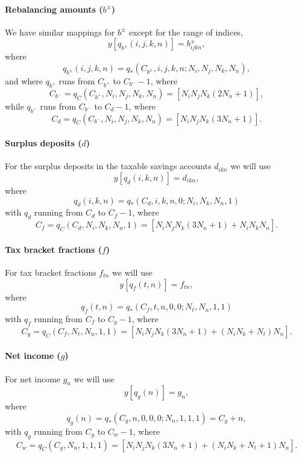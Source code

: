 \documentclass{article}[fleqn,12pt]
\begin{document}
\paragraph*{Rebalancing amounts (\boldmath$b^\pm$)}
We have similar mappings for $b^\pm$ except for the range of indices,
\begin{equation}
	y[q_{b^\pm}(i, j, k, n)] = b^\pm_{ijkn},
\end{equation}
where
\begin{equation}
	q_{b^\pm}(i, j, k, n) = q_*(C_{b^\pm}, i, j, k, n; N_i, N_j, N_k, N_n),
\end{equation}
and where
$q_{b^+}$ runs from $C_{b^+}$ to $C_{b^-} - 1$,
where
\[
	C_{b^-} = q_C(C_{b^+}, N_i, N_j, N_k, N_n) = [N_i N_j N_k (2N_n + 1)],
\]
while
$q_{b^-}$ runs from $C_{b^-}$ to $C_d - 1$, where
\[
	C_d = q_C(C_{b^-}, N_i, N_j, N_k, N_n) = [N_i N_j N_k  (3N_n + 1)].
\]

\paragraph*{Surplus deposits (\boldmath$d$)}
For the surplus deposits in the taxable savings accounts $d_{ikn}$ we will use
\begin{equation}
	y[q_d(i, k, n)] = d_{ikn},
\end{equation}
where
\begin{equation}
	q_d(i, k, n) = q_*(C_d, i, k, n, 0; N_i, N_k, N_n, 1)
\end{equation}
with $q_d$ running from $C_d$ to $C_f - 1$, where
\[
	C_f = q_C(C_d, N_i, N_k, N_n, 1) = [N_iN_jN_k(3N_n+1) + N_iN_kN_n].
\]

\paragraph*{Tax bracket fractions (\boldmath$f$)}
For tax bracket fractions $f_{t n}$ we will use
\begin{equation}
	y[q_f(t, n)] = f_{t n},
\end{equation}
where
\begin{equation}
	q_f(t, n) = q_*(C_f, t, n, 0, 0; N_t, N_n, 1, 1)
\end{equation}
with $q_f$ running from $C_f$ to $C_g - 1$, where
\[
	C_g = q_C(C_f, N_t, N_n, 1, 1) = [N_iN_jN_k(3N_n+1) + (N_iN_k + N_t) N_n].
\]

\paragraph*{Net income (\boldmath$g$)}
For net income $g_{n}$ we will use
\begin{equation}
	y[q_g(n)] = g_{n},
\end{equation}
where
\begin{equation}
	q_g(n) = q_*(C_g, n, 0, 0, 0; N_n, 1, 1, 1) = C_g + n,
\end{equation}
with $q_g$ running from $C_g$ to $C_w - 1$, where
\[
	C_w = q_C(C_g, N_n, 1, 1, 1) = [N_iN_jN_k(3N_n+1) + (N_iN_k + N_t + 1) N_n].
\]
\end{document}
